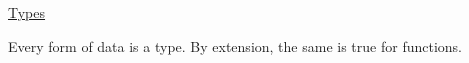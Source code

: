 \mbox{\hyperlink{Types}{Types}}

Every form of data is a type. By extension, the same is true for functions. 